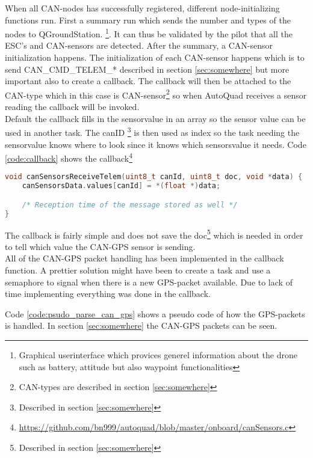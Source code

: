 When all CAN-nodes has successfully registered, different node-initializing functions run.
First a summary run which sends the number and types of the nodes to QGroundStation. \footnote{Graphical userinterface which provices generel information about the drone such as battery, attitude but also waypoint functionalities}.
It can thus be validated by the pilot that all the ESC's and CAN-sensors are detected.
After the summary, a CAN-sensor initialization happens. The initialization of each CAN-sensor happens which is to send CAN\_CMD\_TELEM\_* described in section \ref{sec:somewhere} but more important also to create a callback.
The callback will then be attached to the CAN-type which in this case is CAN-sensor\footnote{CAN-types are described in section \ref{sec:somewhere}} so when AutoQuad receives a sensor reading the callback will be invoked.\\

Default the callback fills in the sensorvalue in an array so the sensor value can be used in another task. The canID \footnote{Described in section \ref{sec:somewhere}} is then used as index so the task needing the sensorvalue knows where to look since it knows which sensorsvalue it needs. Code \ref{code:callback} shows the callback\footnote{\url{https://github.com/bn999/autoquad/blob/master/onboard/canSensors.c}}
\begin{lstlisting}[language = c, caption = Callback invoked when a CAN-sensorvalue is received. It stores the value in an array indexed by canId, label=code:callback]
void canSensorsReceiveTelem(uint8_t canId, uint8_t doc, void *data) {
    canSensorsData.values[canId] = *(float *)data;

	/* Reception time of the message stored as well */
}
\end{lstlisting}
The callback is fairly simple and does not save the doc\footnote{Described in section \ref{sec:somewhere}} which is needed in order to tell which value the CAN-GPS sensor is sending.\\

All of the CAN-GPS packet handling has been implemented in the callback function. A prettier solution might have been to create a task and use a semaphore to signal when there is a new GPS-packet available. Due to lack of time implementing everything was done in the callback.

Code \ref{code:psudo_parse_can_gps} shows a pseudo code of how the GPS-packets is handled. In section \ref{sec:somewhere} the CAN-GPS packets can be seen.

